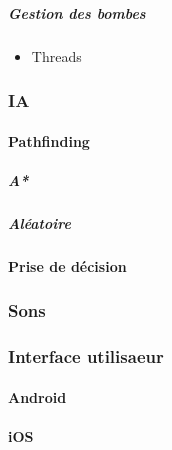 			\subparagraph{Gestion des bombes}
				\begin{itemize}
					\item{Threads}
				\end{itemize}
	
	\subsubsection{IA}
	
		\hypertarget{IA}{}
		\label{IA}
		
		\paragraph{Pathfinding}
			\subparagraph{A*}
			\subparagraph{Aléatoire}
			\paragraph{Prise de décision}
			

	\subsubsection{Sons}
	
		\hypertarget{Sons}{}
		\label{Sons}
	
	\subsubsection{Interface utilisaeur}
		\paragraph{Android}
		\paragraph{iOS}